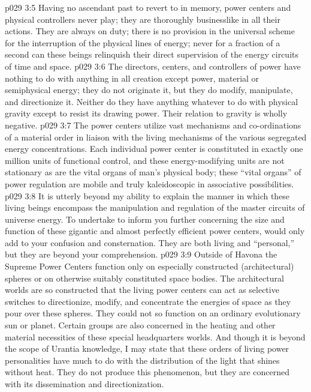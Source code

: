 \vs p029 3:5 Having no ascendant past to revert to in memory, power centers and physical controllers never play; they are thoroughly businesslike in all their actions. They are always on duty; there is no provision in the universal scheme for the interruption of the physical lines of energy; never for a fraction of a second can these beings relinquish their direct supervision of the energy circuits of time and space.
\pc \vs p029 3:6 The directors, centers, and controllers of power have nothing to do with anything in all creation except power, material or semiphysical energy; they do not originate it, but they do modify, manipulate, and directionize it. Neither do they have anything whatever to do with physical gravity except to resist its drawing power. Their relation to gravity is wholly negative.
\vs p029 3:7 The power centers utilize vast mechanisms and co\hyp{}ordinations of a material order in liaison with the living mechanisms of the various segregated energy concentrations. Each individual power center is constituted in exactly one million units of functional control, and these energy\hyp{}modifying units are not stationary as are the vital organs of man’s physical body; these “vital organs” of power regulation are mobile and truly kaleidoscopic in associative possibilities.
\vs p029 3:8 It is utterly beyond my ability to explain the manner in which these living beings encompass the manipulation and regulation of the master circuits of universe energy. To undertake to inform you further concerning the size and function of these gigantic and almost perfectly efficient power centers, would only add to your confusion and consternation. They are both living and “personal,” but they are beyond your comprehension.
\pc \vs p029 3:9 Outside of Havona the Supreme Power Centers function only on especially constructed (architectural) spheres or on otherwise suitably constituted space bodies. The architectural worlds are so constructed that the living power centers can act as selective switches to directionize, modify, and concentrate the energies of space as they pour over these spheres. They could not so function on an ordinary evolutionary sun or planet. Certain groups are also concerned in the heating and other material necessities of these special headquarters worlds. And though it is beyond the scope of Urantia knowledge, I may state that these orders of living power personalities have much to do with the distribution of the light that shines without heat. They do not produce this phenomenon, but they are concerned with its dissemination and directionization.
